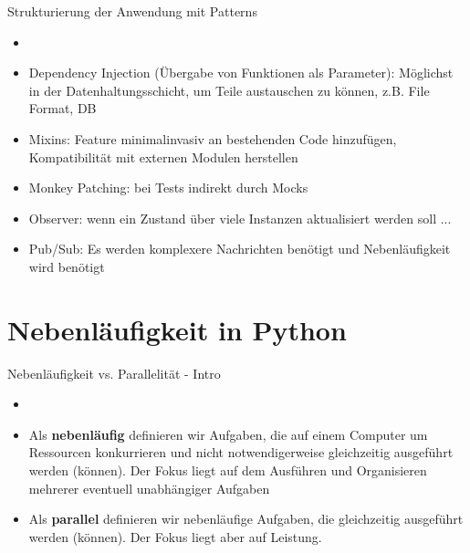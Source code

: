 \begin{frame}{Strukturierung der Anwendung mit Patterns}
      \begin{itemize}
        \setlength{\itemindent}{1.5in}
        \item [\textbf{Einsatz der Patterns}]
    \end{itemize}

    \begin{itemize}
        \item Dependency Injection (Übergabe von Funktionen als Parameter): Möglichst in der Datenhaltungsschicht, um Teile austauschen zu können, z.B. File Format, DB
        \item Mixins: Feature minimalinvasiv an bestehenden Code hinzufügen, Kompatibilität mit externen Modulen herstellen
        \item Monkey Patching:  bei Tests indirekt durch Mocks
        \item Observer:  wenn ein Zustand über viele Instanzen aktualisiert werden soll ...
        \item Pub/Sub:  Es werden komplexere Nachrichten benötigt und Nebenläufigkeit  wird benötigt
    \end{itemize}   

\end{frame}


\section{Nebenläufigkeit in Python}

\begin{frame}{Nebenläufigkeit vs. Parallelität - Intro}
        \begin{itemize}
        \setlength{\itemindent}{2.0in}
        \item [\textbf{Definition: Nebenläufig vs. Parallel}]
    \end{itemize}

    \begin{itemize}
        \item Als \textbf{nebenläufig} definieren wir Aufgaben, die auf einem Computer um Ressourcen konkurrieren und nicht notwendigerweise gleichzeitig ausgeführt werden (können). Der Fokus liegt auf dem Ausführen und Organisieren mehrerer eventuell unabhängiger Aufgaben
        \item Als \textbf{parallel} definieren wir nebenläufige Aufgaben, die gleichzeitig ausgeführt werden (können). Der Fokus liegt aber auf Leistung.
     \end{itemize}
\end{frame}


